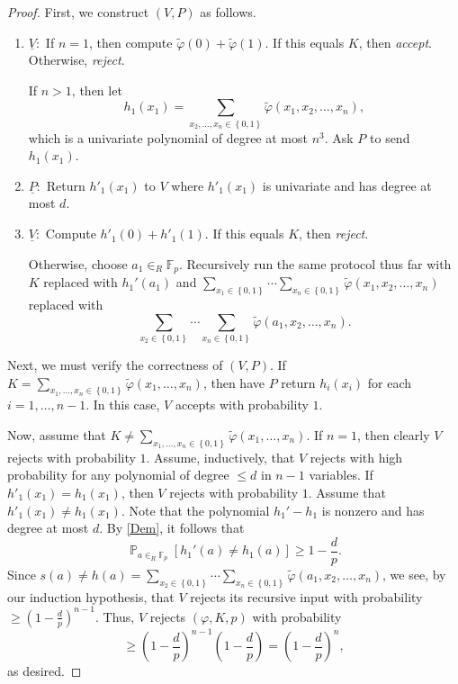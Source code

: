 \documentclass[10pt,letterpaper,cm]{nupset}
\theoremstyle{definition}
\theoremstyle{theorem}
\theoremstyle{remark}
\newcommand{\F}{\mathbb F}
\newcommand{\1}{\mathbf{1}}
\newcommand{\0}{\vec 0}
\DeclareMathOperator{\pr}{\mathbb{P}}
\begin{document}
\begin{proof} 
First, we construct $\left(V, P\right)$ as follows. 
\begin{enumerate}
\item $\underline{V}:$ If $n=1$, then compute $\tilde{\varphi}(0) + \tilde{\varphi}(1)$. If this equals $K$, then \textit{accept}. Otherwise, \textit{reject}. 

If $n>1$, then let $$h_1(x_1) = \sum_{x_2, \ldots, x_n \in \left\{0,1\right\}} \tilde{\varphi}(x_1, x_2, \ldots, x_n),$$ which is a univariate polynomial of degree at most $n^3$. Ask $P$ to send $h_1(x_1)$. 
\item $\underline{P}:$ Return  $h'_1(x_1)$ to $V$ where $h'_1(x_1)$ is univariate and has degree at most $d$. 
\item $\underline{V}:$ Compute $h'_1(0) + h'_1(1)$. If this equals $K$, then \textit{reject}. 

Otherwise,  choose $a_1 \in_R \F_p$. Recursively run the same protocol thus far with $K$ replaced with $h_1'(a_1)$ and $ \sum_{x_1 \in \left\{0,1\right\}} \cdots \sum_{x_n \in \left\{0,1\right\}} \tilde{\varphi}(x_1, x_2, \ldots, x_n)$ replaced with $$\sum_{x_2 \in \left\{0,1\right\}} \cdots \sum_{x_n \in \left\{0,1\right\}} \tilde{\varphi}(a_1, x_2, \ldots, x_n).$$
\end{enumerate}
Next, we must verify the correctness of $\left(V,P\right)$. If $K = \sum_{x_1, \ldots, x_n \in \left\{0,1\right\}} \tilde{\varphi}(x_1, \ldots, x_n)$, then have $P$ return $h_i(x_i)$ for each $i=1, \ldots, {n-1}$. In this case, $V$ accepts with probability $1$. 

\medskip

 Now, assume that $K \ne \sum_{x_1, \ldots, x_n \in \left\{0,1\right\}} \tilde{\varphi}(x_1, \ldots, x_n)$.  If $n=1$, then clearly $V$ rejects with probability $1$. Assume, inductively, that $V$ rejects with high probability for any polynomial of degree $\leq d$ in $n-1$ variables. If $h'_1(x_1) = h_1(x_1)$, then $V$ rejects with probability $1$. Assume that $h'_1(x_1) \ne h_1(x_1)$.  Note that the polynomial $h_1' - h_1$ is nonzero and has degree at most $d$.  By \cref{Dem}, it follows that  $$\pr_{a \in_R \F_p}\left[h_1'(a) \ne h_1(a)\right] \geq 1- \frac{d}{p}.$$ Since $s(a) \ne h(a) = \sum_{x_2 \in \left\{0,1\right\}} \cdots \sum_{x_n \in \left\{0,1\right\}} \tilde{\varphi}(a_1, x_2, \ldots, x_n)$, we see, by our induction hypothesis, that $V$ rejects its recursive input with probability $\geq (1-\frac{d}{p})^{n-1}$. Thus, $V$ rejects $\left(\varphi, K, p\right)$ with probability $$ \geq \left(1-\frac{d}{p}\right)^{n-1}  \left(1-\frac{d}{p}\right) = \left(1-\frac{d}{p}\right)^{n},$$ as desired.
\end{proof}
\end{document}
